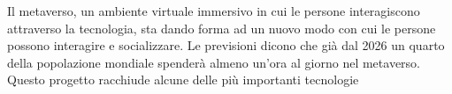 Il metaverso, un ambiente virtuale immersivo in cui le persone interagiscono attraverso la tecnologia, sta dando forma ad un nuovo modo con cui le persone possono interagire e socializzare. Le previsioni dicono che già dal 2026 un quarto della popolazione mondiale spenderà almeno un'ora al giorno nel metaverso. \\
Questo progetto racchiude alcune delle più importanti tecnologie